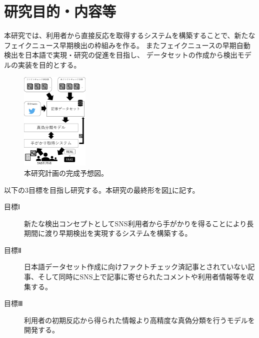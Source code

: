 
\section{研究目的・内容等}

\vspace{20pt}
本研究では、利用者から直接反応を取得するシステムを構築することで、新たなフェイクニュース早期検出の枠組みを作る。
またフェイクニュースの早期自動検出を日本語で実現・研究の促進を目指し、
データセットの作成から検出モデルの実装を目的とする。


\setlength\intextsep{0pt}
\setlength\textfloatsep{0pt}
\begin{figure}
    \vspace{-2\baselineskip}
    \centering
    \includegraphics[width=0.29\textwidth]{figs/final.pdf}
    \vspace{-1cm} 
    \caption{本研究計画の完成予想図。}
    \label{fig:dataset}
    \vspace{-3\baselineskip}
\end{figure}

以下の3目標を目指し研究する。本研究の最終形を図\ref{fig:dataset}に記す。
\begin{description}
    \item[目標Ⅰ] 新たな検出コンセプトとしてSNS利用者から手がかりを得ることにより長期間に渡り早期検出を実現するシステムを構築する。
    \item[目標Ⅱ] 日本語データセット作成に向けファクトチェック済記事とされていない記事、そして同時にSNS上で記事に寄せられたコメントや利用者情報等を収集する。
    \item[目標Ⅲ] 利用者の初期反応から得られた情報より高精度な真偽分類を行うモデルを開発する。
\end{description}

